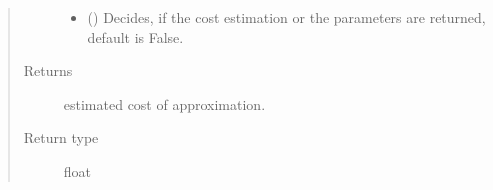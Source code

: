 \documentclass[letterpaper,10pt,english]{sphinxmanual}
\begin{document}
\begin{fulllineitems}
\begin{quote}
\begin{description}
\begin{itemize}
\item {} 
 (\sphinxstyleliteralemphasis{\sphinxupquote{, }}) \textendash{} Decides, if the cost estimation or the parameters are returned, default is False.

\end{itemize}

\item[{Returns}] \leavevmode
estimated cost of approximation.

\item[{Return type}] \leavevmode
float

\end{description}\end{quote}

\end{fulllineitems}

\end{document}
